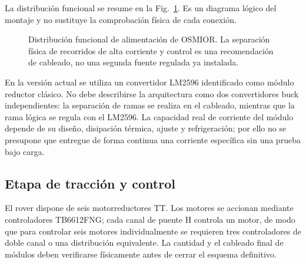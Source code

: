 \documentclass[conference]{IEEEtran}
\begin{document}
La distribución funcional se resume en la Fig.~\ref{fig:power}. Es un diagrama lógico del montaje y no sustituye la comprobación física de cada conexión.

\begin{figure}[!t]
\centering
{}
\caption{Distribución funcional de alimentación de OSMIOR. La separación física de recorridos de alta corriente y control es una recomendación de cableado, no una segunda fuente regulada ya instalada.}
\label{fig:power}
\end{figure}

En la versión actual se utiliza un convertidor LM2596 identificado como módulo reductor clásico. No debe describirse la arquitectura como dos convertidores buck independientes: la separación de ramas se realiza en el cableado, mientras que la rama lógica se regula con el LM2596. La capacidad real de corriente del módulo depende de su diseño, disipación térmica, ajuste y refrigeración; por ello no se presupone que entregue de forma continua una corriente específica sin una prueba bajo carga.

\subsection{Etapa de tracción y control}
El rover dispone de seis motorreductores TT. Los motores se accionan mediante controladores TB6612FNG; cada canal de puente H controla un motor, de modo que para controlar seis motores individualmente se requieren tres controladores de doble canal o una distribución equivalente. La cantidad y el cableado final de módulos deben verificarse físicamente antes de cerrar el esquema definitivo.
\end{document}
